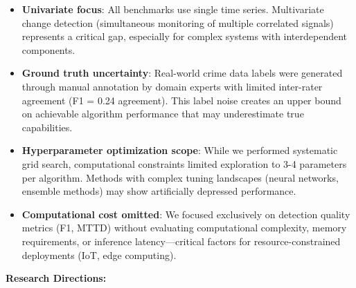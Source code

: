 \documentclass[journal,article,submit,pdftex,moreauthors]{Definitions/mdpi}
\begin{document}
\begin{itemize}
    \item \textbf{Univariate focus}: All benchmarks use single time series. Multivariate change detection (simultaneous monitoring of multiple correlated signals) represents a critical gap, especially for complex systems with interdependent components.
    
    \item \textbf{Ground truth uncertainty}: Real-world crime data labels were generated through manual annotation by domain experts with limited inter-rater agreement (F1 = 0.24 agreement). This label noise creates an upper bound on achievable algorithm performance that may underestimate true capabilities.
    
    \item \textbf{Hyperparameter optimization scope}: While we performed systematic grid search, computational constraints limited exploration to 3-4 parameters per algorithm. Methods with complex tuning landscapes (neural networks, ensemble methods) may show artificially depressed performance.
    
    \item \textbf{Computational cost omitted}: We focused exclusively on detection quality metrics (F1, MTTD) without evaluating computational complexity, memory requirements, or inference latency—critical factors for resource-constrained deployments (IoT, edge computing).
\end{itemize}

\textbf{Research Directions:}
\end{document}
